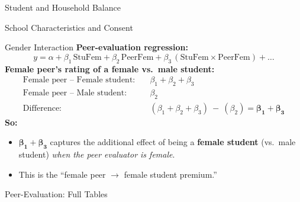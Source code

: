 \documentclass[xcolor=usenames,dvipsnames]{beamer}
\begin{document}
\begin{frame}{Student and Household Balance}
\label{balance}
\hyperlink{slide:sample}{}

\end{frame}
\begin{frame}{School Characteristics and Consent}
\label{descriptives}
\hyperlink{slide:sample}{}

\end{frame}

\begin{frame}{Gender Interaction}
\label{slide:gender_int}
\footnotesize
\textbf{Peer-evaluation regression:}
\[
y = \alpha + \beta_1\, \text{StuFem} + \beta_2\, \text{PeerFem} + \beta_3\, (\text{StuFem} \times \text{PeerFem}) + \ldots
\]
\medskip
\textbf{Female peer's rating of a \textcolor{blue!70!black}{female} vs.\ \textcolor{blue!70!black}{male} student:}
\begin{align*}
\text{Female peer -- Female student:} &\quad \beta_1 + \beta_2 + \beta_3 \\
\text{Female peer -- Male student:}   &\quad \beta_2 \\
\text{Difference:}     &\quad (\beta_1 + \beta_2 + \beta_3)\ -\ (\beta_2) = \bm{\beta_1 + \beta_3}
\end{align*}
\medskip
\textbf{So:}
\begin{itemize}
    \item[] $\bm{\beta_1 + \beta_3}$ captures the additional effect of being a \textbf{female student} (vs.\ male student) \emph{when the peer evaluator is female}.
    \item[] This is the ``female peer $\rightarrow$ female student premium.''
\end{itemize}
\hyperlink{slide:ff_premium}{}
\end{frame}


\begin{frame}{Peer-Evaluation: Full Tables}
\label{slide:peer_full}

\hyperlink{slide:ff_premium}{}
\end{frame}

\end{document}
